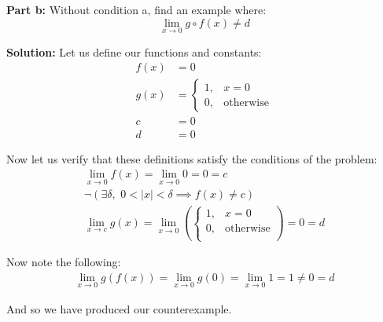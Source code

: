 \documentclass{article}
\begin{document}
\noindent\textbf{Part b:} Without condition a, find an example where:
\begin{equation*}
  \lim_{x\to 0}g\circ f(x)\not=d
\end{equation*}
\bigskip

\noindent\textbf{Solution:} Let us define our functions and constants:
\begin{align*}
  f(x)&=0\\
  g(x)&=\begin{cases}
    1,&x=0\\
    0,&\text{otherwise}
  \end{cases}\\
  c&=0\\
  d&=0
\end{align*}

Now let us verify that these definitions satisfy the conditions of the problem:
\begin{gather*}
  \lim_{x\to0}f(x)=\lim_{x\to0}0=0=c\\
  \neg(\exists\delta,\,\,0<|x|<\delta\implies f(x)\not=c)\tag{$\forall x, f(x)=0=c$}\\
  \lim_{x\to c}g(x)=\lim_{x\to 0}\left(\begin{cases}
    1,&x=0\\
    0,&\text{otherwise}\\
  \end{cases}\right)=0=d
\end{gather*}

Now note the following:
\begin{align*}
  \lim_{x\to0}g(f(x))=\lim_{x\to0}g(0)=\lim_{x\to0}1=1\not=0=d
\end{align*}

And so we have produced our counterexample.
\end{document}
